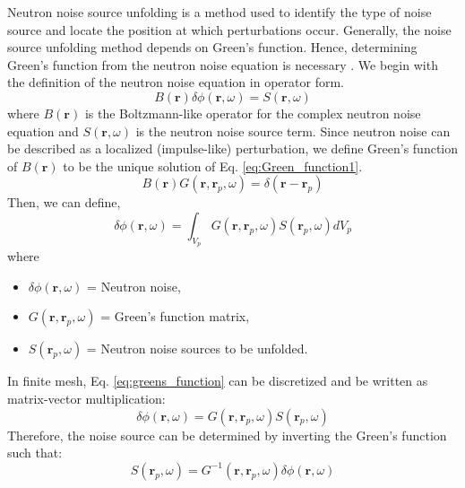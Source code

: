 Neutron noise source unfolding is a method used to identify the type of noise source and locate the position at which perturbations occur. Generally, the noise source unfolding method depends on Green’s function. Hence, determining Green’s function from the neutron noise equation is necessary \cite{demaziereIdentificationLocalizationAbsorbers2005}. We begin with the definition of the neutron noise equation in operator form.
\begin{equation}
    B(\textbf{r}) \delta \phi(\textbf{r},\omega) = S(\textbf{r},\omega)
\end{equation}
where $B(\textbf{r})$ is the Boltzmann-like operator for the complex neutron noise equation and $S(\textbf{r},\omega)$ is the neutron noise source term. Since neutron noise can be described as a localized (impulse-like) perturbation, we define Green's function of $B(\textbf{r})$ to be the unique solution of Eq. \ref{eq:Green_function1}.
\begin{equation}\label{eq:Green_function1} 
    B(\textbf{r}) G(\textbf{r}, \textbf{r}_p,\omega) = \delta(\textbf{r}-\textbf{r}_p)
\end{equation}
Then, we can define,
\begin{equation}\label{eq:greens_function}
    \delta \phi(\textbf{r}, \omega) = \int_{V_p} G(\textbf{r}, \textbf{r}_p,\omega) S(\textbf{r}_p,\omega) dV_p
\end{equation}
where
\begin{itemize}
    \item[] $\delta \phi(\textbf{r}, \omega) $ = Neutron noise,
    \item[] $G(\textbf{r}, \textbf{r}_p,\omega)$ = Green's function matrix,
    \item[] $S(\textbf{r}_p,\omega)$ = Neutron noise sources to be unfolded.
\end{itemize}

In finite mesh, Eq. \ref{eq:greens_function} can be discretized and be written as matrix-vector multiplication:
\begin{equation}
    \delta \phi(\textbf{r}, \omega) = G(\textbf{r}, \textbf{r}_p,\omega) S(\textbf{r}_p,\omega)
\end{equation}
Therefore, the noise source can be determined by inverting the Green’s function such that:
\begin{equation}\label{eq:source_initial}
    S(\textbf{r}_p,\omega) = G^{-1}(\textbf{r}, \textbf{r}_p,\omega) \delta \phi(\textbf{r}, \omega)
\end{equation}

